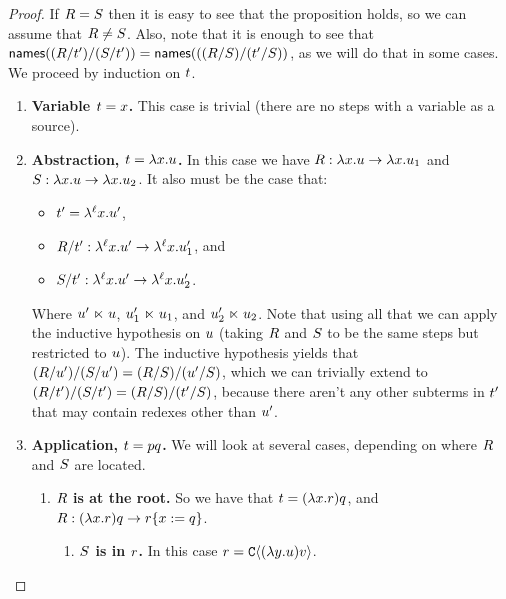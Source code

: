 \begin{proof}
If $R = S$ then it is easy to see that the proposition holds, so we can assume that $R \neq S$.
  Also, note that it is enough to see that $\mathsf{names}((R/t')/(S/t')) = \mathsf{names}(((R/S)/(t'/S))$, as we will do that in some cases.
We proceed by induction on $t$.
\begin{gonzaenv}
\begin{enumerate}
  \item {\bf Variable $t = x$.} This case is trivial (there are no steps with a variable as a source).
  \item {\bf Abstraction, $t = \lambda x. u$.}
    In this case we have $R : \lambda x. u \to \lambda x. u_1$ and
    $S : \lambda x. u \to \lambda x. u_2$.
    It also must be the case that:
      \begin{itemize}
        \item $t' = \lambda^{\ell} x. u'$,
        \item $R / t' : \lambda^{\ell} x. u' \to \lambda^{\ell} x. u_1'$, and
        \item $S / t' : \lambda^{\ell} x. u' \to \lambda^{\ell} x. u_2'$.
      \end{itemize}
    Where $u' \mathrel{\ltimes} u$, $u_1' \mathrel{\ltimes} u_1$, and $u_2' \mathrel{\ltimes} u_2$.
    Note that using all that we can apply the inductive hypothesis on $u$
    (taking $R$ and $S$ to be the same steps but restricted to $u$).
    The inductive hypothesis yields that
    $(R/u')/(S/u') = (R/S)/(u'/S)$,
    which we can trivially extend to
    $(R/t')/(S/t') = (R/S)/(t'/S)$,
    because there aren't any other subterms in $t'$ that may contain redexes other than $u'$.
  \item {\bf Application, $t = p q$.} We will look at several cases, depending on where
    $R$ and $S$ are located.
    \begin{enumerate}
      \item {\bf $R$ is at the root.} So we have that $t = (\lambda x. r) q$, and
        $R : (\lambda x. r) q \to r\{x := q\}$.
        \begin{enumerate}
          \item {\bf $S$ is in $r$.} In this case $r = \mathtt{C}\langle(\lambda y. u) v\rangle$.

\end{enumerate}
\end{enumerate}
\end{enumerate}
\end{gonzaenv}
\end{proof}
